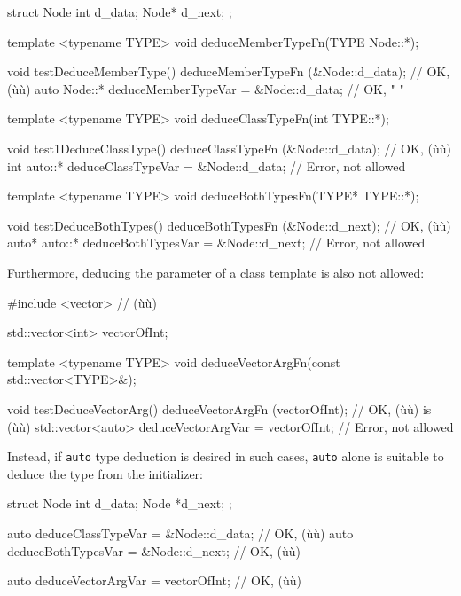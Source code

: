 \begin{emcppslisting}
struct Node
{
    int   d_data;
    Node* d_next;
};

template <typename TYPE>
void deduceMemberTypeFn(TYPE Node::*);

void testDeduceMemberType()
{
                 deduceMemberTypeFn   (&Node::d_data);  // OK, (ù{}ù)
    auto Node::* deduceMemberTypeVar = &Node::d_data;   // OK,  "     "
}

template <typename TYPE>
void deduceClassTypeFn(int TYPE::*);

void test1DeduceClassType()
{
                deduceClassTypeFn   (&Node::d_data);  // OK, (ù{}ù)
    int auto::* deduceClassTypeVar = &Node::d_data;   // Error, not allowed
}

template <typename TYPE>
void deduceBothTypesFn(TYPE* TYPE::*);

void testDeduceBothTypes()
{
                  deduceBothTypesFn   (&Node::d_next);  // OK, (ù{}ù)
    auto* auto::* deduceBothTypesVar = &Node::d_next;   // Error, not allowed
}
\end{emcppslisting}
    
\noindent Furthermore, deducing the parameter of a class template is also not
allowed:

\begin{emcppshiddenlisting}[emcppsbatch=e22]
#include <vector>     // (ù{}ù)
\end{emcppshiddenlisting}
\begin{emcppslisting}[emcppsbatch=e22]
std::vector<int> vectorOfInt;

template <typename TYPE>
void deduceVectorArgFn(const std::vector<TYPE>&);

void testDeduceVectorArg()
{
                      deduceVectorArgFn   (vectorOfInt); // OK, (ù{}ù) is (ù{}ù)
    std::vector<auto> deduceVectorArgVar = vectorOfInt;  // Error, not allowed
}
\end{emcppslisting}
    
\noindent Instead, if \lstinline!auto! type deduction is desired in such cases,
\lstinline!auto! alone is suitable to deduce the type from the initializer:

\begin{emcppshiddenlisting}[emcppsbatch=e22]
struct Node {
int d_data;
Node *d_next;
};
\end{emcppshiddenlisting}
\begin{emcppslisting}[emcppsbatch=e22]
auto deduceClassTypeVar = &Node::d_data;  // OK, (ù{}ù)
auto deduceBothTypesVar = &Node::d_next;  // OK, (ù{}ù)

auto deduceVectorArgVar = vectorOfInt;    // OK, (ù{}ù)
\end{emcppslisting}
    

